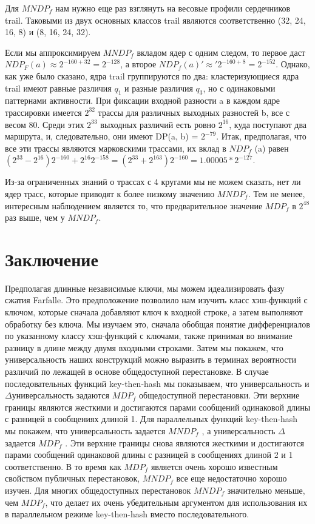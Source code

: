 \documentclass[utf8,14pt,a4paper,oneside,russian]{book}
\begin{document}
Для $MNDP_f$ нам нужно еще раз взглянуть на весовые профили сердечников 
trail. Таковыми из двух основных классов trail являются соответственно 
(32, 24, 16, 8) и (8, 16, 24, 32).

Если мы аппроксимируем $MNDP_f$ вкладом ядер с одним следом, то первое 
даст $NDP_F (a) \approx 2^{-160 + 32} = 2^{-128}$, а второе 
$NDP_f (a) '\approx' 2^{-160 + 8} = 2^{-152}$. Однако, как уже было сказано, 
ядра trail группируются по два: кластеризующиеся ядра trail имеют равные 
различия $q_1$ и разные различия $q_3$, но с одинаковыми паттернами 
активности. При фиксации входной разности a в каждом ядре трассировки 
имеется $2^{32}$ трассы для различных выходных разностей b, все с весом 80. 
Среди этих $2^{33}$ выходных различий есть ровно $2^{16}$, куда поступают два 
маршрута, и, следовательно, они имеют DP(a, b) = $2^{-79}$. Итак, 
предполагая, что все эти трассы являются марковскими трассами, их вклад 
в $NDP_f$ (a) равен $(2^{33} - 2^{16})2^{-160} + 2^{16}2^{-158} 
= (2^{33} + 2^{163})2^{-160} = 1.00005 * 2^{-127}$.

Из-за ограниченных знаний о трассах с 4 кругами мы не можем сказать, 
нет ли ядер трасс, которые приводят к более низкому значению $MNDP_f$. 
Тем не менее, интересным наблюдением является то, что предварительное 
значение $MDP_f$ в $2^{48}$ раз выше, чем у $MNDP_f$.


\newpage
    \section{Заключение}
    
    Предполагая длинные независимые ключи, мы можем идеализировать фазу 
    сжатия Farfalle. Это предположение позволило нам изучить класс 
    хэш-функций с ключом, которые сначала добавляют ключ к входной строке, 
    а затем выполняют обработку без ключа. Мы изучаем это, сначала обобщая 
    понятие дифференциалов по указанному классу хэш-функций с ключами, также 
    принимая во внимание разницу в длине между двумя входными строками. 
    Затем мы покажем, что универсальность наших конструкций можно выразить 
    в терминах вероятности различий по лежащей в основе общедоступной 
    перестановке. В случае последовательных функций key-then-hash мы 
    показываем, что универсальность и $\Delta$универсальность задаются 
    $MDP_f$ общедоступной перестановки. Эти верхние границы являются 
    жесткими и достигаются парами сообщений одинаковой длины с разницей в 
    сообщениях длиной 1. Для параллельных функций key-then-hash мы покажем, 
    что универсальность задается $MNDP_f$ , а универсальность $\Delta$ 
    задается $MDP_f$ . Эти верхние границы снова являются жесткими и 
    достигаются парами сообщений одинаковой длины с разницей в сообщениях 
    длиной 2 и 1 соответственно. В то время как $MDP_f$ является очень 
    хорошо известным свойством публичных перестановок, $MNDP_f$ все еще 
    недостаточно хорошо изучен. Для многих общедоступных перестановок 
    $MNDP_f$ значительно меньше, чем $MDP_f$, что делает их очень 
    убедительным аргументом для использования их в параллельном режиме 
    key-then-hash вместо последовательного.
\end{document}
